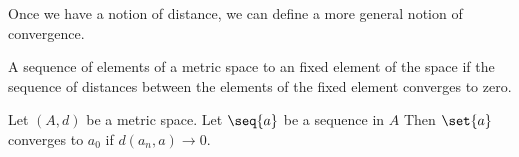 
\sbasic





















\sstart
{}


Once we have a notion of distance, we
can define a more general notion of
convergence.


A sequence of elements of a metric
space 
to an fixed element of the space if the
sequence of distances between the
elements of the fixed element converges
to zero.


Let $(A, d)$ be a metric space.
Let $\seq{a}$ be a sequence in $A$
Then $\set{a}$ converges to
$a_0$ if $d(a_n, a) \to 0$.
\strats
